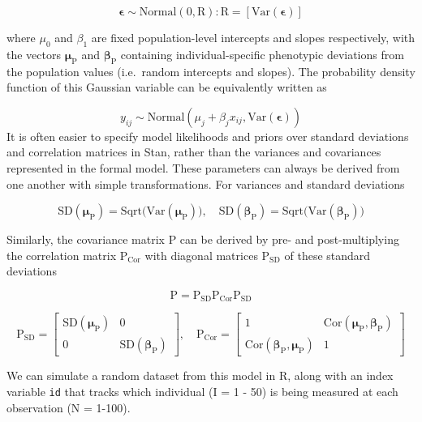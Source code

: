 \documentclass[
]{book}
\begin{document}
\[ \boldsymbol{\epsilon} \sim \mathrm{Normal}(0, \boldsymbol{\mathrm{R}} ): 
\boldsymbol{\mathrm{R}} =
[\mathrm{Var}(\boldsymbol{\epsilon})]\]

where \(\mu_0\) and \(\beta_1\) are fixed population-level intercepts and slopes respectively, with the vectors \(\boldsymbol{\mu_{\mathrm{P}}}\) and \(\boldsymbol{\beta_{\mathrm{P}}}\) containing individual-specific phenotypic deviations from the population values (i.e.~random intercepts and slopes). The probability density function of this Gaussian variable can be equivalently written as

\[y_{ij} \sim \mathrm{Normal}(\mu_{j}+\beta_{j}x_{ij},\mathrm{Var}(\boldsymbol{\epsilon}))\]
It is often easier to specify model likelihoods and priors over standard deviations and correlation matrices in Stan, rather than the variances and covariances represented in the formal model. These parameters can always be derived from one another with simple transformations. For variances and standard deviations

\[\mathrm{SD}( \boldsymbol{\mu_{\mathrm{P}}}  ) = \mathrm{Sqrt(Var} (\boldsymbol{\boldsymbol{\mu_{\mathrm{P}}} }) ) , \quad \mathrm{SD}( \boldsymbol{\beta_{\mathrm{P}}}  ) = \mathrm{Sqrt(Var} (\boldsymbol{\boldsymbol{\beta_{\mathrm{P}}} }) )\]

Similarly, the covariance matrix \(\boldsymbol{\mathrm{P}}\) can be derived by pre- and post-multiplying the correlation matrix \(\boldsymbol{\mathrm{P_{Cor}}}\) with diagonal matrices \(\boldsymbol{\mathrm{P_{SD}}}\) of these standard deviations

\[\boldsymbol{\mathrm{P}} =  \boldsymbol{\mathrm{P_{SD}}} \boldsymbol{\mathrm{P_{Cor}}} \boldsymbol{\mathrm{P_{SD}}}\]

\[ \boldsymbol{\mathrm{P_{SD}}} = \begin{bmatrix} \mathrm{SD}( \boldsymbol{\mu_{\mathrm{P}}} )     &  0    \\ 
0     &     \mathrm{SD}( \boldsymbol{\beta_{\mathrm{P}}} ) \end{bmatrix}, \quad 
 \boldsymbol{\mathrm{P_{Cor}}} = \begin{bmatrix} 1     &  \mathrm{Cor}( \boldsymbol{\mu_{\mathrm{P}}}, \boldsymbol{\beta_{\mathrm{P}}} )    \\ 
\mathrm{Cor}( \boldsymbol{\beta_{\mathrm{P}}} , \boldsymbol{\mu_{\mathrm{P}}} )      &    1
\end{bmatrix} \]

We can simulate a random dataset from this model in R, along with an index variable \texttt{id} that tracks which individual (I = 1 - 50) is being measured at each observation (N = 1-100).
\end{document}
